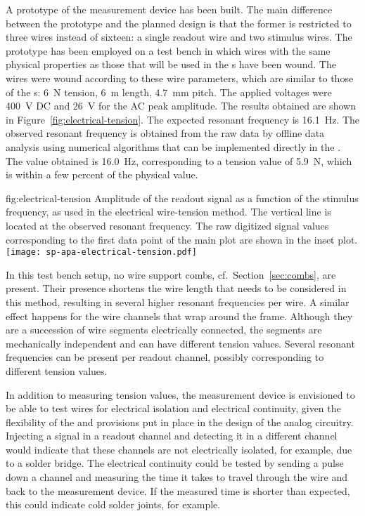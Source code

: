 A prototype of the measurement device has been built. The main difference between the prototype and the planned design is that the former is restricted to three wires instead of sixteen: a single readout wire and two stimulus wires. The prototype has been employed on a test bench in which wires with the same physical properties as those that will be used in the s have been wound. The wires were wound according to these wire parameters, which are similar to those of the s: \SI{6}{N} tension, \SI{6}{m} length, \SI{4.7}{mm} pitch. The applied voltages were \SI{400}{V} DC and \SI{26}{V} for the AC peak amplitude. The results obtained are shown in Figure~\ref{fig:electrical-tension}. The expected resonant frequency is \SI{16.1}{Hz}. The observed resonant frequency is obtained from the raw data by offline data analysis using numerical algorithms that can be implemented directly in the . The value obtained is \SI{16.0}{Hz}, corresponding to a tension value of \SI{5.9}{N}, which is within a few percent of the physical value.

\begin{dunefigure}{fig:electrical-tension}
{Amplitude of the readout signal as a function of the stimulus frequency, as used in the electrical wire-tension method. The vertical line is located at the observed resonant frequency. The raw digitized signal values corresponding to the first data point of the main plot are shown in the inset plot.}
\texttt{[image: sp-apa-electrical-tension.pdf]}
\end{dunefigure}

In this test bench setup, no wire support combs, cf.\ Section~\ref{sec:combs}, are present. Their presence shortens the wire length that needs to be considered in this method, resulting in several higher resonant frequencies per wire. A similar effect happens for the wire channels that wrap around the  frame. Although they are a succession of wire segments electrically connected, the segments are mechanically independent and can have different tension values. Several resonant frequencies can be present per readout channel, possibly corresponding to different tension values.

In addition to measuring tension values, the measurement device is envisioned to be able to test wires for electrical isolation and electrical continuity, given the flexibility of the  and provisions put in place in the design of the analog circuitry. Injecting a signal in a readout channel and detecting it in a different channel would indicate that these channels are not electrically isolated, for example, due to a solder bridge. The electrical continuity could be tested by sending a pulse down a channel and measuring the time it takes to travel through the wire and back to the measurement device.  If the measured time is shorter than expected, this could indicate cold solder joints, for example.

